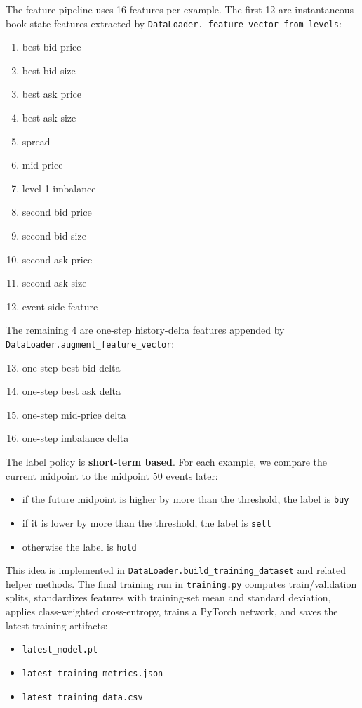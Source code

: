 \documentclass[11pt]{article}
\begin{document}
The feature pipeline uses 16 features per example. The first 12 are instantaneous
book-state features extracted by
\texttt{DataLoader.\_feature\_vector\_from\_levels}:
\begin{enumerate}
    \item best bid price
    \item best bid size
    \item best ask price
    \item best ask size
    \item spread
    \item mid-price
    \item level-1 imbalance
    \item second bid price
    \item second bid size
    \item second ask price
    \item second ask size
    \item event-side feature
\end{enumerate}

The remaining 4 are one-step history-delta features appended by
\texttt{DataLoader.augment\_feature\_vector}:
\begin{enumerate}
    \setcounter{enumi}{12}
    \item one-step best bid delta
    \item one-step best ask delta
    \item one-step mid-price delta
    \item one-step imbalance delta
\end{enumerate}

The label policy is \textbf{short-term based}. For each example, we compare
the current midpoint to the midpoint 50 events later:
\begin{itemize}
    \item if the future midpoint is higher by more than the threshold, the
    label is \texttt{buy}
    \item if it is lower by more than the threshold, the label is
    \texttt{sell}
    \item otherwise the label is \texttt{hold}
\end{itemize}

This idea is implemented in \texttt{DataLoader.build\_training\_dataset} and
related helper methods. The final training run in \texttt{training.py}
computes train/validation splits, standardizes features with training-set mean
and standard deviation, applies class-weighted cross-entropy, trains a PyTorch network, and saves the latest training artifacts:
\begin{itemize}
    \item \texttt{latest\_model.pt}
    \item \texttt{latest\_training\_metrics.json}
    \item \texttt{latest\_training\_data.csv}
\end{itemize}
\end{document}
